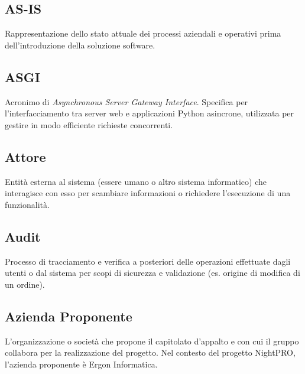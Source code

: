 \documentclass[a4paper, 11pt, oneside]{scrartcl} %
\begin{document}
\vspace{0.5cm}

\subsection*{AS-IS}
Rappresentazione dello stato attuale dei processi aziendali e operativi prima dell'introduzione della soluzione software.
\vspace{0.5cm}

\subsection*{ASGI}
Acronimo di \textit{Asynchronous Server Gateway Interface}. Specifica per l'interfacciamento tra server web e applicazioni Python asincrone, utilizzata per gestire in modo efficiente richieste concorrenti.
\vspace{0.5cm}

\subsection*{Attore}
Entità esterna al sistema (essere umano o altro sistema informatico) che interagisce con esso per scambiare informazioni o richiedere l'esecuzione di una funzionalità.
\vspace{0.5cm}

\subsection*{Audit}
Processo di tracciamento e verifica a posteriori delle operazioni effettuate dagli utenti o dal sistema per scopi di sicurezza e validazione (es. origine di modifica di un ordine).
\vspace{0.5cm}

\subsection*{Azienda Proponente}


L'organizzazione o società che propone il capitolato d'appalto e con cui il gruppo collabora per la realizzazione del progetto. Nel contesto del progetto NightPRO, l'azienda proponente è Ergon Informatica.
\end{document}
